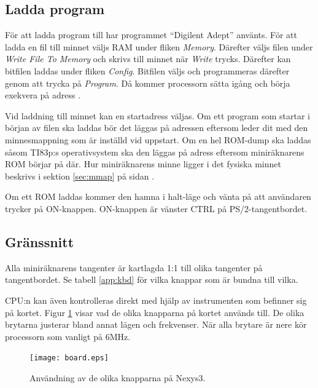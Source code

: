 \documentclass[main.tex]{subfiles}
\begin{document}
\subsection{Ladda program}
För att ladda program till har programmet ``Digilent Adept'' använts. För att
ladda en fil till minnet väljs RAM under fliken {\it Memory}. Därefter väljs
filen under {\it Write File To Memory} och skrivs till minnet när {\it Write}
trycks. Därefter kan bitfilen laddas under fliken {\it Config}. Bitfilen väljs
och programmeras därefter genom att trycka på {\it Program}. Då kommer
processorn sätta igång och börja exekvera på adress .

Vid laddning till minnet kan en startadress väljas. Om ett program som startar
i början av filen ska laddas bör det läggas på adressen  eftersom
 leder dit med den minnesmappning som är inställd vid uppstart. Om
en hel ROM-dump ska laddas såsom TI83p:s operativsystem ska den läggas på
adress  eftersom miniräknarens ROM börjar på där. Hur miniräknarens
minne ligger i det fysiska minnet beskrivs i sektion \ref{sec:mmap} på sidan
\pageref{sec:mmap}.

Om ett ROM laddas kommer den hamna i halt-läge och vänta på att användaren
trycker på ON-knappen. ON-knappen är vänster CTRL på PS/2-tangentbordet.

\subsection{Gränssnitt}
Alla miniräknarens tangenter är kartlagda 1:1 till olika tangenter på
tangentbordet. Se tabell \ref{app:kbd} för vilka knappar som är bundna till
vilka.

CPU:n kan även kontrolleras direkt med hjälp av instrumenten som befinner sig
på kortet. Figur \ref{fig:interface} visar vad de olika knapparna på kortet
används till. De olika brytarna justerar bland annat lägen och frekvenser. När
alla brytare är nere kör processorn som vanligt på 6MHz.

\begin{figure}[b]
    \centering
    \texttt{[image: board.eps]}
    \caption{Användning av de olika knapparna på Nexys3.}
    \label{fig:interface}
\end{figure}
\end{document}
